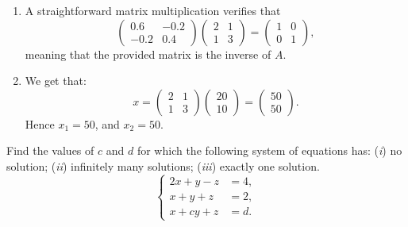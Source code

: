 \documentclass[11pt]{exam}
\begin{document}
\begin{questions}
\begin{solution}[0cm]
\begin{enumerate}[leftmargin = 0.5cm, label = (\alph*), rightmargin = 0.2cm]
        \item A straightforward matrix multiplication verifies that
        \[ 
        \begin{pmatrix}
        0.6 & -0.2 \\
        -0.2 & 0.4
        \end{pmatrix}
        \begin{pmatrix}
        2 & 1 \\
        1 & 3 
        \end{pmatrix} = 
        \begin{pmatrix}
        1 & 0 \\
        0 & 1 
        \end{pmatrix},
        \]
        meaning that the provided matrix is the inverse of $A$. 

        \item We get that:
        \[
        x = \begin{pmatrix} 2 & 1 \\ 1 & 3 \end{pmatrix} \begin{pmatrix} 20 \\ 10 \end{pmatrix} = \begin{pmatrix} 50 \\ 50 \end{pmatrix}.
        \]
        Hence $x_1 = 50$, and $x_2 = 50$.
        
    \end{enumerate}   
    
\end{solution}

\question[2]
    Find the values of $c$ and $d$ for which the following system of equations has: (\textit{i}) no solution; (\textit{ii}) infinitely many solutions; (\textit{iii}) exactly one solution.
    $$
    \left\{
    \begin{aligned}
        2x  + y - z &= 4, \\
        x   + y + z &= 2, \\
        x   + cy + z &= d.
    \end{aligned}
    \right.
    $$


\end{questions}
\end{document}
